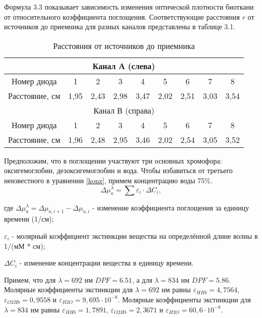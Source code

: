 Формула 3.3 показывает зависимость изменения оптической плотности биоткани от относительного коэффициента поглощения. Соответствующие расстояния $r$ от источников до приемника для разных каналов представлены в таблице 3.1.

\begin{table}[!h]
\raggedright
\captionsetup[table]{singlelinecheck=false,justification=raggedleft}
{\caption{Расстояния от источников до приемника}}
{\begin{tabular}{|c|c|c|c|c|c|c|c|c|}
\hline
\multicolumn{9}{|c|}{Канал А (слева)}\\
\hline
Номер диода    &  1   &  2 &  3  &  4  &  5  & 6 &  7  &  8    \\
\hline
Расстояние, см &  1,95 &  2,43  &  2,98 &  3,47 &  2,02 & 2,51 & 3,03 & 3,54 \\
\hline
\multicolumn{9}{|c|}{Канал В (справа)}\\
\hline
Номер диода  & 1 &  2  &  3   &  4  & 5  &  6   &  7  &  8    \\
\hline
Расстояние, см & 1,96 & 2,48 & 2,95 & 3,46 &  2,02 &  2,54 &  3,05 & 3,52\\
\hline
\end{tabular}}
\end{table}

Предположим, что в поглощении участвуют три основных хромофора: оксигемоглобин, дезоксигемоглобин и вода. Чтобы избавиться от третьего неизвестного в уравнении \ref{konz}, примем концентрацию воды 75\%.
\begin{equation}\label{konz}
\Delta \mu_a^{\lambda} =\sum{\varepsilon_i \cdot \Delta C_i},
\end{equation}

где $\Delta \mu_a^{\lambda}=\Delta \mu_{a,i+1}-\Delta \mu_{a,i}$ - изменение коэффициента поглощения за единицу времени (1/см);

$\varepsilon_i$ - молярный коэффициент экстинкции вещества на определённой длине волны в 1/(мМ * см);

$\Delta C_i$ - изменение концентрации вещества в единицу времени.

Примем, что для $\lambda= 692$ нм $DPF = 6.51$, а для $\lambda= 834$ нм $DPF = 5.86$.
Молярные коэффициенты экстинкции для $\lambda= 692$ нм равны $\varepsilon_{HHb}=4,7564$, $\varepsilon_{O2Hb}=0,9558$ и $\varepsilon_{H2O}=9,695 \cdot 10^{-8}$.
Молярные коэффициенты экстинкции для $\lambda= 834$ нм равны $\varepsilon_{HHb}=1,7891$, $\varepsilon_{O2Hb}=2,3671$ и $\varepsilon_{H2O}=60,6 \cdot 10^{-8}$.

